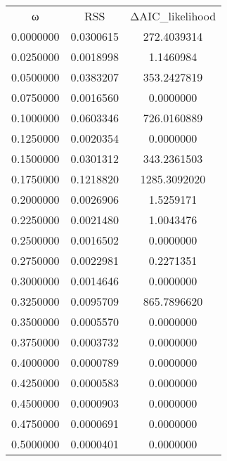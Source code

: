 \begin{tabular}{ccc}
ω & RSS & ΔAIC_likelihood\\
0.0000000 & 0.0300615 & 272.4039314\\
0.0250000 & 0.0018998 & 1.1460984\\
0.0500000 & 0.0383207 & 353.2427819\\
0.0750000 & 0.0016560 & 0.0000000\\
0.1000000 & 0.0603346 & 726.0160889\\
0.1250000 & 0.0020354 & 0.0000000\\
0.1500000 & 0.0301312 & 343.2361503\\
0.1750000 & 0.1218820 & 1285.3092020\\
0.2000000 & 0.0026906 & 1.5259171\\
0.2250000 & 0.0021480 & 1.0043476\\
0.2500000 & 0.0016502 & 0.0000000\\
0.2750000 & 0.0022981 & 0.2271351\\
0.3000000 & 0.0014646 & 0.0000000\\
0.3250000 & 0.0095709 & 865.7896620\\
0.3500000 & 0.0005570 & 0.0000000\\
0.3750000 & 0.0003732 & 0.0000000\\
0.4000000 & 0.0000789 & 0.0000000\\
0.4250000 & 0.0000583 & 0.0000000\\
0.4500000 & 0.0000903 & 0.0000000\\
0.4750000 & 0.0000691 & 0.0000000\\
0.5000000 & 0.0000401 & 0.0000000\\
\end{tabular}
